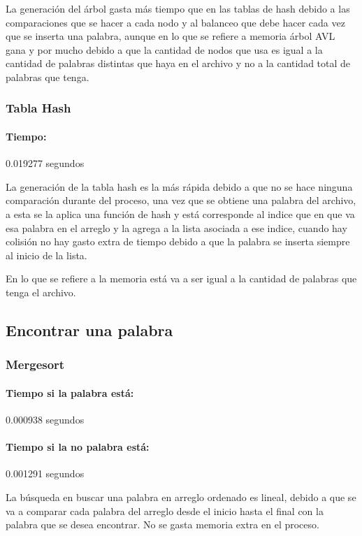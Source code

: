 \documentclass[12pt,letterpaper]{scrartcl}
\begin{document}
La generación del árbol gasta más tiempo que en las tablas de hash debido a las comparaciones que se hacer a cada nodo y al balanceo que debe hacer cada vez que se inserta una palabra, aunque en lo que se refiere a memoria árbol AVL gana y por mucho debido a que la cantidad de nodos que usa es igual a la cantidad de palabras distintas que haya en el archivo y no a la cantidad total de palabras que tenga.

\subsubsection{Tabla Hash}

\paragraph{Tiempo:} 0.019277 segundos

La generación de la tabla hash es la más rápida debido a que no se hace ninguna comparación durante del proceso, una vez que se obtiene una palabra del archivo, a esta se la aplica una función de hash y está corresponde al indice que en que va esa palabra en el arreglo y la agrega a la lista asociada a ese indice, cuando hay colisión no hay gasto extra de tiempo debido a que la palabra se inserta siempre al inicio de la lista.

En lo que se refiere a la memoria está va a ser igual a la cantidad de palabras que tenga el archivo.

\subsection{Encontrar una palabra}

\subsubsection{Mergesort}

\paragraph{Tiempo si la palabra está:} 0.000938 segundos

\paragraph{Tiempo si la no palabra está:} 0.001291 segundos

La búsqueda en buscar una palabra en arreglo ordenado es lineal, debido a que se va a comparar cada palabra del arreglo desde el inicio hasta el final con la palabra que se desea encontrar. No se gasta memoria extra en el proceso.
\end{document}

